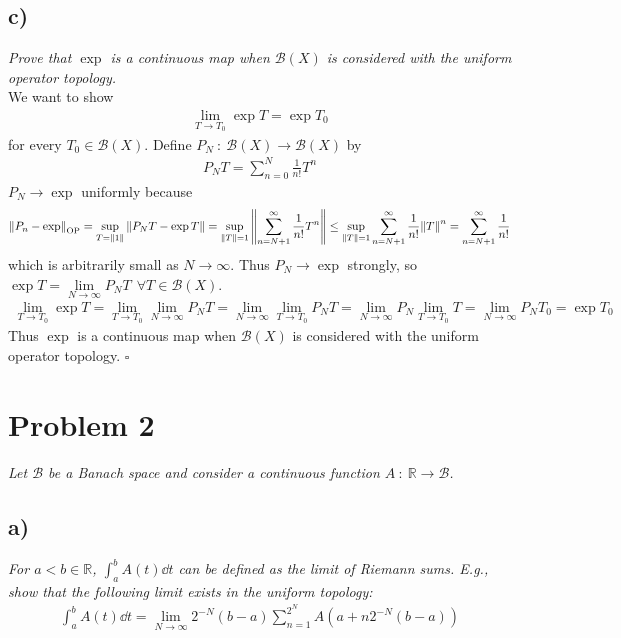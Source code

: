 \documentclass[12pt]{article}
\theoremstyle{plain}
\begin{document}
\subsection*{ c)}
\emph{Prove that $\exp$ is a continuous map when $\mathcal{B}(X)$ is considered with the uniform operator topology.} \\

We want to show
\begin{align*}
    \lim_{T\rightarrow T_0}\exp T = \exp T_0
\end{align*}
for every $T_0 \in \mathcal{B}(X)$.  Define $P_N\ :\ \mathcal{B}(X) \rightarrow \mathcal{B}(X)$ by
\begin{align*}
    P_NT = \sum_{n=0}^N \frac{1}{n!}T^n
\end{align*}
$P_N \rightarrow \exp$ uniformly because
\begin{align*}
    \norm{P_n - \exp}_{\text{OP}} = \sup\limits_{T = \norm{1}}\norm{P_NT - \exp T} = \sup\limits_{\norm{T}=1}\norm{\sum_{n=N+1}^\infty \frac{1}{n!}T^n} \leq \sup\limits_{\norm{T}=1}\sum_{n=N+1}^\infty\frac{1}{n!}\norm{T}^n = \sum_{n=N+1}^\infty \frac{1}{n!}
\end{align*}
which is arbitrarily small as $N \rightarrow \infty$.  Thus $P_N \rightarrow \exp$ strongly, so $\exp T = \lim\limits_{N\rightarrow\infty} P_N T\ \ \forall T \in\mathcal{B}(X)$.
\begin{align*}
    \lim_{T \rightarrow T_0} \exp T = \lim_{T\rightarrow T_0}\lim_{N\rightarrow \infty} P_N T = \lim_{N\rightarrow \infty}\lim_{T\rightarrow T_0}P_N T = \lim_{N\rightarrow \infty} P_N\lim_{T\rightarrow T_0}T = \lim_{N\rightarrow \infty} P_N T_0 = \exp T_0
\end{align*}
Thus $\exp$ is a continuous map when $\mathcal{B}(X)$ is considered with the uniform operator topology. \hfill $\square$

\section*{Problem 2}
\emph{Let $\mathcal{B}$ be a Banach space and consider a continuous function $A\ :\ \mathbb{R} \rightarrow \mathcal{B}$.}

\subsection*{ a)}
\emph{For $a < b \in \mathbb{R}$, $\int_a^b A(t) \dd t$ can be defined as the limit of Riemann sums.  E.g., show that the following limit exists in the uniform topology:}
\begin{align*}
    \int_a^b A(t) \dd t = \lim_{N\rightarrow \infty}2^{-N}(b-a)\sum_{n=1}^{2^N} A(a + n2^{-N}(b-a))
\end{align*}
\end{document}
